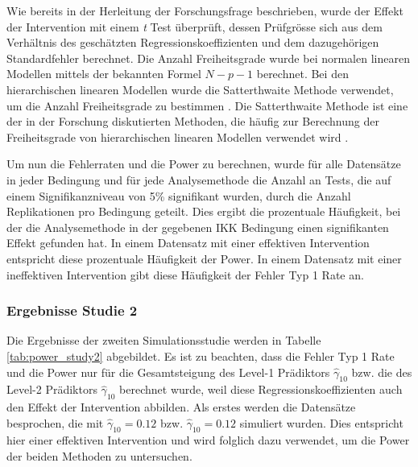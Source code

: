 \documentclass[12pt]{article}\usepackage[]{graphicx}\usepackage[]{color}
\begin{document}
Wie bereits in der Herleitung der Forschungsfrage beschrieben, wurde der Effekt der Intervention mit einem \textit{t} Test überprüft, dessen Prüfgrösse sich aus dem Verhältnis des geschätzten Regressionskoeffizienten und dem dazugehörigen Standardfehler berechnet. Die Anzahl Freiheitsgrade wurde bei normalen linearen Modellen mittels der bekannten Formel $N - p - 1$ berechnet. Bei den hierarchischen linearen Modellen wurde die Satterthwaite Methode verwendet, um die Anzahl Freiheitsgrade zu bestimmen \citeyearpar{satter1941synthesis}. Die Satterthwaite Methode ist eine der in der Forschung diskutierten Methoden, die häufig zur Berechnung der Freiheitsgrade von hierarchischen linearen Modellen verwendet wird \citep{raudenbush2002hierarchical,SnijdersTomA.B2012Ma:a}. 

Um nun die Fehlerraten und die Power zu berechnen, wurde für alle Datensätze in jeder Bedingung und für jede Analysemethode die Anzahl an Tests, die auf einem Signifikanzniveau von 5\% signifikant wurden, durch die Anzahl Replikationen pro Bedingung geteilt. Dies ergibt die prozentuale Häufigkeit, bei der die Analysemethode in der gegebenen IKK Bedingung einen signifikanten Effekt gefunden hat. In einem Datensatz mit einer effektiven Intervention entspricht diese prozentuale Häufigkeit der Power. In einem Datensatz mit einer ineffektiven Intervention gibt diese Häufigkeit der Fehler Typ 1 Rate an.

\subsubsection{Ergebnisse Studie 2}
Die Ergebnisse der zweiten Simulationsstudie werden in Tabelle \ref{tab:power_study2} abgebildet. Es ist zu beachten, dass die Fehler Typ 1 Rate und die Power nur für die Gesamtsteigung des Level-1 Prädiktors $\widehat{\gamma}_{10}$ bzw. die des Level-2 Prädiktors $\widehat{\gamma}_{10}$ berechnet wurde, weil diese Regressionskoeffizienten auch den Effekt der Intervention abbilden. Als erstes werden die Datensätze besprochen, die mit $\widehat{\gamma}_{10} = 0.12$ bzw. $\widehat{\gamma}_{10} = 0.12$ simuliert wurden. Dies entspricht hier einer effektiven Intervention und wird folglich dazu verwendet, um die Power der beiden Methoden zu untersuchen.
\end{document}

